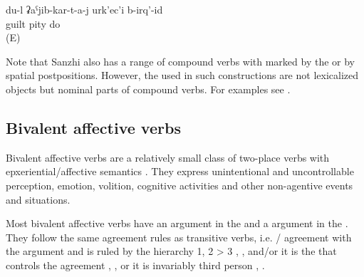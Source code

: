 \begin{exe}
	\ex	\label{ex:I pity the convicted}
	\gll	du-l	ʡaˁjib-kar-t-a-j	urk'ec'i	b-irq'-id\\
			guilt	pity	do\\
	\glt	{} (E)

\end{exe}

Note that Sanzhi also has a range of compound verbs with  marked by the  or by spatial postpositions. However, the  used in such constructions are not lexicalized objects but nominal parts of compound verbs. For examples see .


\subsection{Bivalent affective verbs}
\label{sec:Bivalent affective verbs}
Bivalent affective verbs are a relatively small class of two-place verbs with epxeriential\slash affective semantics . They express unintentional and uncontrollable perception, emotion, volition, cognitive activities and other non-agentive events and situations. 


\begin{exe}
	\ex	\label{ex:bivalent affective verbs}
	\begin{xlist}
		\ex	{} 
		\ex	{} 
		\ex	{} 
		\ex	{} 
		\ex	{} 
		\ex	{} 
		\ex	{} 
		\ex	{} 
		\ex	{} 
		\ex	{} 
		\ex	{} 
	\end{xlist}
\end{exe}

Most bivalent affective verbs have an  argument in the  and a  argument in the . They follow the same agreement rules as transitive verbs, i.e. / agreement with the  argument and  is ruled by the hierarchy 1, 2 > 3 , , and/or it is the  that controls the agreement , , or it is invariably third person , . 



